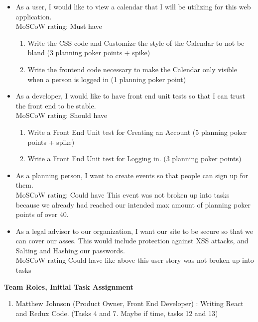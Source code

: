 \documentclass[2pt]{article}
\begin{document}
\begin{flushleft}
\begin{itemize}
\begin{enumerate}[resume]
						 \end{enumerate}
            \item As a user, I would like to view a calendar that I will be utilizing for this web application.
            \\MoSCoW rating: Must have
            \begin{enumerate}[resume]
                \item Write the CSS code and Customize the style of the Calendar to not be bland (3 planning poker points + spike)
                \item Write the frontend code necessary to make the Calendar only visible when a person is logged in (1 planning poker point)
            \end{enumerate}
            \item As a developer, I would like to have front end unit tests so that I can trust the front end to be stable.\\MoSCoW rating: Should have
						 \begin{enumerate}[resume]
						 				\item Write a Front End Unit test for Creating an Account (5 planning poker points + spike)
						 				\item Write a Front End Unit test for Logging in. (3 planning poker points)
						 \end{enumerate}
						 \item As a planning person, I want to create events so that people can sign up for them.
						 \\MoSCoW rating: Could have \qquad This event was not broken up into tasks because we already had reached our intended max amount of planning poker points of over 40.
						 \item As a legal advisor to our organization, I want our site to be secure so that we can cover our asses. This would include protection against XSS attacks, and Salting and Hashing our passwords.
						 \\MoSCoW rating Could have \qquad like above this user story was not broken up into tasks
        \end{itemize}
        \item \item \textbf{Team Roles, Initial Task Assignment }
        \begin{enumerate}
            	\item Matthew Johnson (Product Owner, Front End Developer) : Writing React and Redux Code. (Tasks  4 and 7. Maybe if time, tasks 12 and 13)

\end{enumerate}
\end{flushleft}
\end{document}
